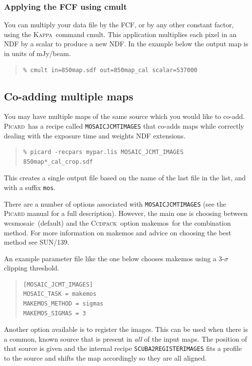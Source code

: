 \documentclass[twoside,11pt]{article}
\newcommand{\xref}[3]{#1}
\newcommand{\xlabel}[1]{}
\renewcommand{\_}{\texttt{\symbol{95}}}
\newenvironment{myquote}{\begin{quote}\begin{small}}{\end{small}\end{quote}}
\newcommand{\ccdpack}{\xref{\textsc{Ccdpack}}{sun139}{}}
\newcommand{\Kappa}{\xref{\textsc{Kappa}}{sun95}{}}
\newcommand{\picard}{\xref{\textsc{Picard}}{sun265}{}}
\newcommand{\drrecipe}[1]{\texttt{#1}}
\newcommand{\task}[1]{\textsf{#1}}
\newcommand{\param}[1]{\texttt{#1}}
\newcommand{\cmult}{\xref{\task{cmult}}{sun95}{CMULT}}
\newcommand{\wcsmosaic}{\xref{\task{wcsmosaic}}{sun95}{WCSMOSAIC}}
\newcommand{\makemos}{\xref{\task{makemos}}{sun139}{MAKEMOS}}
\begin{document}
\subsubsection{Applying the FCF using \cmult}

You can multiply your data file by the FCF, or by any other constant
factor, using the \Kappa\ command \cmult. This application multiplies
each pixel in an NDF by a scalar to produce a new NDF. In the example
below the output map is in units of mJy/beam.

\begin{myquote}
\begin{verbatim}
% cmult in=850map.sdf out=850map_cal scalar=537000
\end{verbatim}
\end{myquote}


\subsection{\xlabel{coadd}Co-adding multiple maps}
\label{sec:coadd}

You may have multiple maps of the same source which you would like to
co-add. \picard\ has a recipe called
\xref{\drrecipe{MOSAIC\_JCMT\_IMAGES}}{sun265}{MOSAIC_JCMT_IMAGES}
that co-adds maps while correctly dealing with the exposure time and
weights NDF extensions.
\begin{myquote}
\begin{verbatim}
% picard -recpars mypar.lis MOSAIC_JCMT_IMAGES 850map*_cal_crop.sdf
\end{verbatim}
\end{myquote}
This creates a single output file based on the name of the last file
in the list, and with a suffix \texttt{\_mos}.

There are a number of options associated with
\param{MOSAIC\_JCMT\_IMAGES} (see the \textsc{Picard} manual for a full
description). However, the main one is choosing between \wcsmosaic\
(default) and the \ccdpack\ option \makemos\ for the combination
method. For more information on \task{makemos} and advice on choosing the
best method see \xref{SUN/139}{sun139}{}.

An example parameter file like the one below chooses \task{makemos}
using a 3-$\sigma$ clipping threshold.
\begin{myquote}
\begin{verbatim}
[MOSAIC_JCMT_IMAGES]
MOSAIC_TASK = makemos
MAKEMOS_METHOD = sigmas
MAKEMOS_SIGMAS = 3
\end{verbatim}
\end{myquote}
Another option available is to register the images. This can be used
when there is a common, known source that is present in \emph{all} of
the input maps. The position of that source is given and the internal
recipe \xref{\drrecipe{SCUBA2\_REGISTER\_IMAGES}}{sun265}{SCUBA2_REGISTER_IMAGES}
fits a profile to the source and shifts the map accordingly so they
are all aligned.
\end{document}
